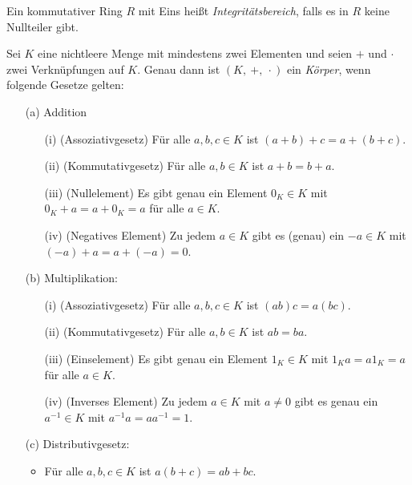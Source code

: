\begin{defn} \label{Integritätsbereich}
Ein kommutativer Ring $R$ mit Eins heißt \textit{Integritätsbereich}, falls es in $R$ keine Nullteiler gibt.
\end{defn}
%
%
%
%
%
%
% 
%
%
% 
\begin{defn}
Sei $K$ eine nichtleere Menge mit mindestens zwei Elementen und seien $+$ und $\cdot$ zwei Verknüpfungen auf $K$. Genau dann ist $\left(K, ~+,~ \cdot\right)$ ein \textit{Körper}, wenn folgende Gesetze gelten:
\begin{enumerate}
\item[(a)] Addition
\begin{enumerate}
\item[(i)] (Assoziativgesetz) Für alle $a, b, c \in K$ ist $\left(a + b \right) + c = a + \left(b +c\right)$.
\item[(ii)] (Kommutativgesetz) Für alle $a, b \in K$ ist $a+b = b + a$.
\item[(iii)] (Nullelement) Es gibt genau ein Element $0_K \in K$ mit $0_K + a = a + 0_K = a$ für alle $a \in K$.
\item[(iv)] (Negatives Element) Zu jedem $a \in K$ gibt es (genau) ein $-a \in K$ mit $\left(-a\right)+ a = a + \left(-a\right)= 0$.
\end{enumerate} 
\item[(b)] Multiplikation:
\begin{enumerate}
\item[(i)] (Assoziativgesetz) Für alle $a, b, c \in K$ ist $\left(ab\right)c = a\left(bc\right)$.
\item[(ii)] (Kommutativgesetz) Für alle $a, b \in K$ ist $ab = ba$.
\item[(iii)] (Einselement) Es gibt genau ein Element $1_K \in K$ mit $1_K a = a 1_K = a$ für alle $a \in K$.
\item[(iv)] (Inverses Element) Zu jedem $a \in K$ mit $a\neq 0 $ gibt es genau ein $a^{-1} \in K$ mit $a^{-1} a = a a^{-1} = 1$.
\end{enumerate}
\item[(c)] Distributivgesetz:
\begin{itemize}
\item Für alle $a, b, c \in K$ ist $a\left(b +c\right) = ab + bc$.
\end{itemize}
\end{enumerate}
\end{defn}



